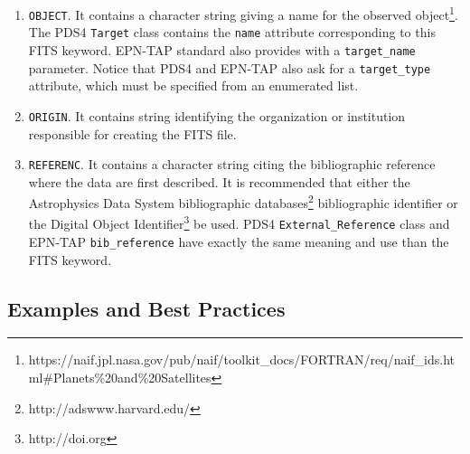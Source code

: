 \begin{enumerate}
\item{\texttt{OBJECT}.
It contains a character string giving a name for the observed
object\footnote{https://naif.jpl.nasa.gov/pub/naif/toolkit\_docs/FORTRAN/req/naif\_ids.html\#Planets\%20and\%20Satellites}.
The PDS4 \texttt{Target} class contains the \texttt{name} attribute corresponding to this
FITS keyword.
EPN-TAP standard also provides with a \texttt{target\_name} parameter.
Notice that PDS4 and EPN-TAP also ask for a \texttt{target\_type} attribute, which must be
specified from an enumerated list.}

\item{\texttt{ORIGIN}.
It contains string identifying the organization or institution responsible for
creating the FITS file.}

%

\item{\texttt{REFERENC}.
It contains a character string citing the bibliographic reference where the
data are first described.
It is recommended that either the Astrophysics Data System bibliographic
databases\footnote{http://adswww.harvard.edu/}
bibliographic identifier or the Digital Object Identifier\footnote{http://doi.org}
be used.
PDS4 \texttt{External\_Reference} class and EPN-TAP \texttt{bib\_reference} have
exactly the same meaning and use than the FITS keyword.}

\end{enumerate}

\subsection{Examples and Best Practices}

